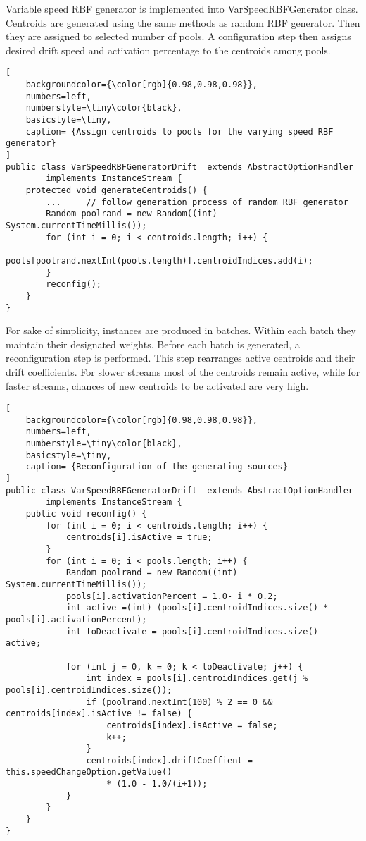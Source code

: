 Variable speed RBF generator is implemented into VarSpeedRBFGenerator class. Centroids are generated using the same methods as random RBF generator. Then they are assigned to selected number of pools. A configuration step then assigns desired drift speed and activation percentage to the centroids among pools.
\begin{lstlisting}[
    backgroundcolor={\color[rgb]{0.98,0.98,0.98}},
    numbers=left,
    numberstyle=\tiny\color{black},
    basicstyle=\tiny,
    caption= {Assign centroids to pools for the varying speed RBF generator}
]
public class VarSpeedRBFGeneratorDrift  extends AbstractOptionHandler 
        implements InstanceStream {
    protected void generateCentroids() {
        ...		// follow generation process of random RBF generator
        Random poolrand = new Random((int) System.currentTimeMillis());
        for (int i = 0; i < centroids.length; i++) {
            pools[poolrand.nextInt(pools.length)].centroidIndices.add(i);
        }
        reconfig();
    }
}
\end{lstlisting}
For sake of simplicity, instances are produced in batches. Within each batch they maintain their designated weights. Before each batch is generated, a reconfiguration step is performed. This step rearranges active centroids and their drift coefficients. For slower streams most of the centroids remain active, while for faster streams, chances of new centroids to be activated are very high.
\begin{lstlisting}[
    backgroundcolor={\color[rgb]{0.98,0.98,0.98}},
    numbers=left,
    numberstyle=\tiny\color{black},
    basicstyle=\tiny,
    caption= {Reconfiguration of the generating sources}
]
public class VarSpeedRBFGeneratorDrift  extends AbstractOptionHandler 
        implements InstanceStream {
    public void reconfig() {
        for (int i = 0; i < centroids.length; i++) {
            centroids[i].isActive = true;
        }
        for (int i = 0; i < pools.length; i++) {
            Random poolrand = new Random((int) System.currentTimeMillis());
            pools[i].activationPercent = 1.0- i * 0.2;
            int active =(int) (pools[i].centroidIndices.size() * pools[i].activationPercent);
            int toDeactivate = pools[i].centroidIndices.size() - active;
            
            for (int j = 0, k = 0; k < toDeactivate; j++) {
                int index = pools[i].centroidIndices.get(j % pools[i].centroidIndices.size());
                if (poolrand.nextInt(100) % 2 == 0 && centroids[index].isActive != false) { 
                    centroids[index].isActive = false;
                    k++;
                }
                centroids[index].driftCoeffient = this.speedChangeOption.getValue() 
                    * (1.0 - 1.0/(i+1));
            }
        }
    }
}
\end{lstlisting}

